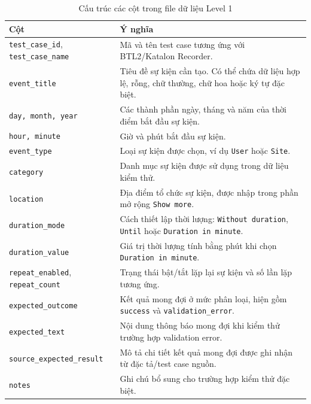 \documentclass[12pt,a4paper]{article}
\begin{document}
\begin{table}[H]
\centering\footnotesize
\begin{tabular}{|L{4.3cm}|L{10.3cm}|}
\hline
{}
\textbf{Cột} & \textbf{Ý nghĩa} \\ \hline

\texttt{test\_case\_id}, \texttt{test\_case\_name}
& Mã và tên test case tương ứng với BTL2/Katalon Recorder. \\ \hline

\texttt{event\_title}
& Tiêu đề sự kiện cần tạo. Có thể chứa dữ liệu hợp lệ, rỗng, chữ thường, chữ hoa hoặc ký tự đặc biệt. \\ \hline

\texttt{day, month, year}
& Các thành phần ngày, tháng và năm của thời điểm bắt đầu sự kiện. \\ \hline

\texttt{hour, minute}
& Giờ và phút bắt đầu sự kiện. \\ \hline

\texttt{event\_type}
& Loại sự kiện được chọn, ví dụ \texttt{User} hoặc \texttt{Site}. \\ \hline

\texttt{category}
& Danh mục sự kiện được sử dụng trong dữ liệu kiểm thử. \\ \hline

\texttt{location}
& Địa điểm tổ chức sự kiện, được nhập trong phần mở rộng \texttt{Show more}. \\ \hline

\texttt{duration\_mode}
& Cách thiết lập thời lượng: \texttt{Without duration}, \texttt{Until} hoặc \texttt{Duration in minute}. \\ \hline

\texttt{duration\_value}
& Giá trị thời lượng tính bằng phút khi chọn \texttt{Duration in minute}. \\ \hline

\texttt{repeat\_enabled}, \texttt{repeat\_count}
& Trạng thái bật/tắt lặp lại sự kiện và số lần lặp tương ứng. \\ \hline

\texttt{expected\_outcome}
& Kết quả mong đợi ở mức phân loại, hiện gồm \texttt{success} và \texttt{validation\_error}. \\ \hline

\texttt{expected\_text}
& Nội dung thông báo mong đợi khi kiểm thử trường hợp validation error. \\ \hline

\texttt{source\_expected\_result}
& Mô tả chi tiết kết quả mong đợi được ghi nhận từ đặc tả/test case nguồn. \\ \hline

\texttt{notes}
& Ghi chú bổ sung cho trường hợp kiểm thử đặc biệt. \\ \hline
\end{tabular}
\caption{Cấu trúc các cột trong file dữ liệu Level 1}
\end{table}
\end{document}
